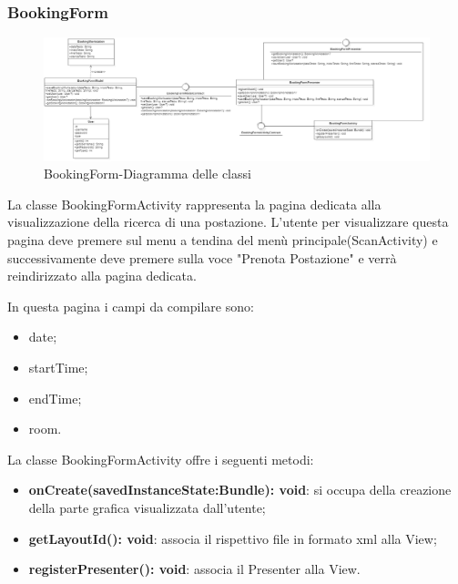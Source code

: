 \subsubsection{BookingForm}
\begin{figure}[H]
	\centering
	\includegraphics[width=16cm]{res/images/BookingForm.png}
	\caption{BookingForm-Diagramma delle classi}
	\label{fig:BookingForm-Diagramma delle classi}
\end{figure}
La classe BookingFormActivity rappresenta la pagina dedicata alla visualizzazione della ricerca di una postazione.
L'utente per visualizzare questa pagina deve premere sul menu a tendina del menù principale(ScanActivity) e successivamente deve premere sulla voce "Prenota Postazione" e verrà reindirizzato alla pagina dedicata.

In questa pagina i campi da compilare sono: 
\begin{itemize}
	\item date; 
	\item startTime; 
	\item endTime; 
	\item room.
	
\end{itemize}

La classe BookingFormActivity offre i seguenti metodi:
\begin{itemize}
	\item \textbf{onCreate(savedInstanceState:Bundle): void}: si occupa della creazione della parte grafica visualizzata dall'utente; 
	\item \textbf{getLayoutId(): void}: associa il rispettivo file in formato xml alla View;
	\item \textbf{registerPresenter(): void}: associa il Presenter alla View. 
\end{itemize}


